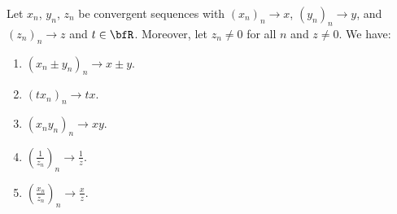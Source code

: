     \begin{theorem}
        Let $x_n$, $y_n$, $z_n$ be convergent sequences with $(x_n)_n \rightarrow x$, $(y_n)_n \rightarrow y$, and $(z_n)_n \rightarrow z$ and $t \in \bfR$. Moreover, let $z_n \neq 0$ for all $n$ and $z \neq 0$. We have:
            \begin{enumerate}[label = (\arabic*)]
                \item $(x_n \pm y_n)_n \rightarrow x \pm y$. 
                \item $(tx_n)_n \rightarrow tx$.
                \item $(x_n y_n)_n \rightarrow xy$.
                \item $\left(\frac{1}{z_n}\right)_n \rightarrow \frac{1}{z}$.
                \item $\left(\frac{x_n}{z_n}\right)_n \rightarrow \frac{x}{z}$.
            \end{enumerate}
    \end{theorem}
